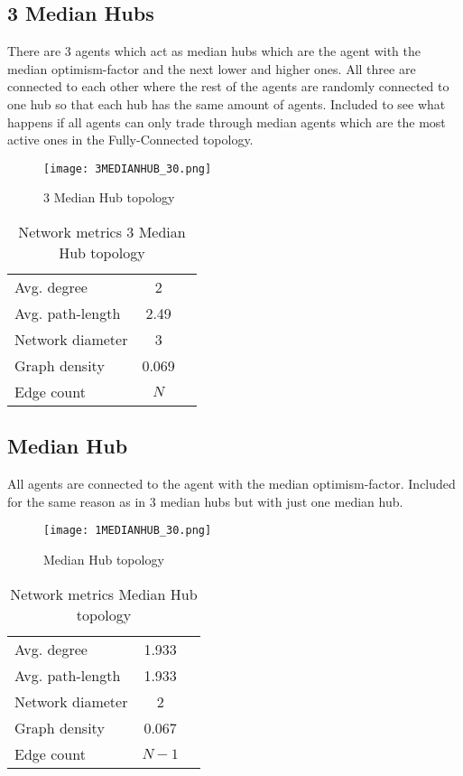 \documentclass[Bachelorarbeit.tex]{subfiles}
\begin{document}
\subsection{3 Median Hubs}
There are 3 agents which act as median hubs which are the agent with the median optimism-factor and the next lower and higher ones. All three are connected to each other where the rest of the agents are randomly connected to one hub so that each hub has the same amount of agents.
\medskip
Included to see what happens if all agents can only trade through median agents which are the most active ones in the Fully-Connected topology.

\begin{figure}[H]
	\centering
  \texttt{[image: 3MEDIANHUB\_30.png]}
	\caption{3 Median Hub topology}
	\label{fig:topology_3MEDIANHUB_30}
\end{figure}

\begin{table}[H]
	\centering
	\caption{Network metrics 3 Median Hub topology}
	\begin{tabular} { l c r }
		\hline
		Avg. degree & 2 \\
		Avg. path-length & 2.49 \\
		Network diameter & 3 \\
		Graph density & 0.069 \\
		Edge count & $N$ \\
		\hline
	\end{tabular}
\end{table}

\subsection{Median Hub}
All agents are connected to the agent with the median optimism-factor.
\medskip
Included for the same reason as in 3 median hubs but with just one median hub.

\begin{figure}[H]
	\centering
  \texttt{[image: 1MEDIANHUB\_30.png]}
	\caption{Median Hub topology}
	\label{fig:topology_1MEDIANHUB_30}
\end{figure}

\begin{table}[H]
	\centering
	\caption{Network metrics Median Hub topology}
	\begin{tabular} { l c r }
		\hline
		Avg. degree & 1.933 \\
		Avg. path-length & 1.933 \\
		Network diameter & 2 \\
		Graph density & 0.067 \\
		Edge count & $N-1$ \\
		\hline
	\end{tabular}
\end{table}
\end{document}

